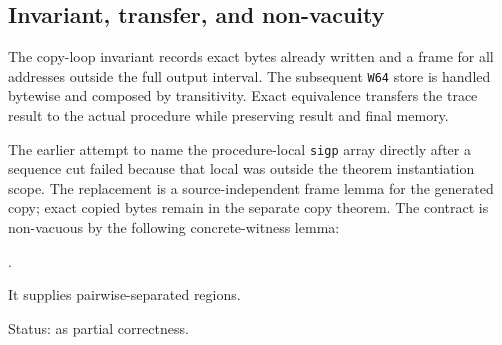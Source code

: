 \subsection{Invariant, transfer, and non-vacuity}

The copy-loop invariant records exact bytes already written and a frame for
all addresses outside the full output interval. The subsequent \texttt{W64}
store is handled bytewise and composed by transitivity. Exact equivalence
 transfers the trace result to the
actual  procedure while
preserving result and final memory.

The earlier attempt to name the procedure-local \texttt{sigp} array directly
after a sequence cut failed because that local was outside the theorem
instantiation scope. The replacement is a source-independent frame lemma for
the generated copy; exact copied bytes remain in the separate copy theorem.
The contract is non-vacuous by the following concrete-witness lemma:
\begin{center}
\small{}.
\end{center}
It supplies pairwise-separated regions.

Status:  as partial correctness.
